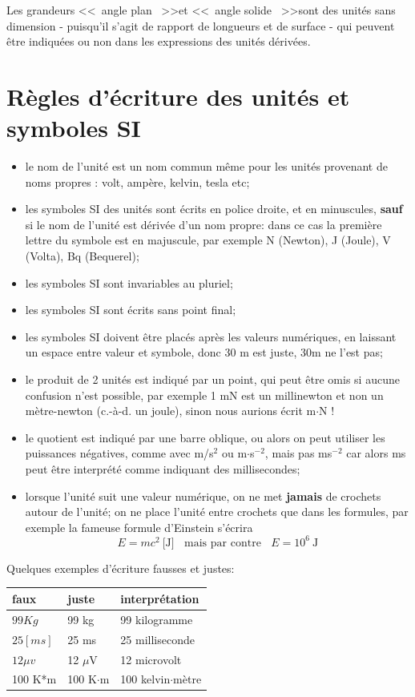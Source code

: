 Les grandeurs \textless\textless\ angle plan \ \textgreater\textgreater et \textless\textless\ angle solide \ \textgreater\textgreater sont des unités sans dimension - puisqu'il s'agit de rapport de longueurs et de surface - qui peuvent être indiquées ou non dans les expressions des unités dérivées.

\section{Règles d'écriture des unités et symboles SI}

\begin{itemize}

\item le nom de l'unité est un nom commun même pour les unités provenant de noms propres : volt, ampère, kelvin, tesla etc;
\item les symboles SI des unités sont écrits en police droite, et en minuscules, \textbf{sauf} si le nom de l'unité est dérivée d'un nom propre: dans ce cas la première lettre du symbole est en majuscule, par exemple N (Newton), J (Joule), V (Volta), Bq (Bequerel);
\item les symboles SI sont invariables au pluriel;
\item les symboles SI sont écrits sans point final;
\item les symboles SI doivent être placés après les valeurs numériques, en laissant un espace entre valeur et symbole, donc 30 m est juste, 30m ne l'est pas;
\item le produit de 2 unités est indiqué par un point, qui peut être omis si aucune confusion n'est possible, par exemple 1 mN est un millinewton et non un mètre-newton (c.-à-d. un joule), sinon nous aurions écrit m$\cdot$N !
\item le quotient est indiqué par une barre oblique, ou alors on peut utiliser les puissances négatives, comme avec m/s$^2$ ou m$\cdot$s$^{-2}$, mais pas ms$^{-2}$ car alors ms peut être interprété comme indiquant des millisecondes;
\item lorsque l'unité suit une valeur numérique, on ne met \textbf{jamais} de crochets autour de l'unité; on ne place l'unité entre crochets que dans les formules, par exemple la fameuse formule d'Einstein s'écrira
$$
E=mc^2\ \text{[J]}\ \ \ \ \text{mais par contre}\ \ \ \ E=10^6\ \text{J}
$$
\end{itemize}
Quelques exemples d'écriture  fausses et justes:

\begin{center}
\begin{tabular}{lll}
faux & juste & interprétation\\\hline
$99Kg$& 99 kg & 99 kilogramme\\
$25 [ms]$ & 25 ms & 25 milliseconde\\
$12 \mu v$ & 12 $\mu$V & 12 microvolt\\
100 K*m & 100 K$\cdot$m & 100 kelvin$\cdot$mètre\\\hline
\end{tabular}
\end{center}